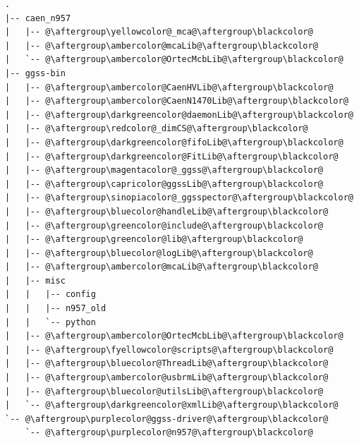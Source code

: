 \newpage

\begin{lstlisting}[language=Cmd, caption={Pierwotna struktura katalogów}, label={lst:oldStructure},escapechar=@]
.
|-- caen_n957
|   |-- @\aftergroup\yellowcolor@_mca@\aftergroup\blackcolor@
|   |-- @\aftergroup\ambercolor@mcaLib@\aftergroup\blackcolor@
|   `-- @\aftergroup\ambercolor@OrtecMcbLib@\aftergroup\blackcolor@
|-- ggss-bin
|   |-- @\aftergroup\ambercolor@CaenHVLib@\aftergroup\blackcolor@
|   |-- @\aftergroup\ambercolor@CaenN1470Lib@\aftergroup\blackcolor@
|   |-- @\aftergroup\darkgreencolor@daemonLib@\aftergroup\blackcolor@
|   |-- @\aftergroup\redcolor@_dimCS@\aftergroup\blackcolor@
|   |-- @\aftergroup\darkgreencolor@fifoLib@\aftergroup\blackcolor@
|   |-- @\aftergroup\darkgreencolor@FitLib@\aftergroup\blackcolor@
|   |-- @\aftergroup\magentacolor@_ggss@\aftergroup\blackcolor@
|   |-- @\aftergroup\capricolor@ggssLib@\aftergroup\blackcolor@
|   |-- @\aftergroup\sinopiacolor@_ggsspector@\aftergroup\blackcolor@
|   |-- @\aftergroup\bluecolor@handleLib@\aftergroup\blackcolor@
|   |-- @\aftergroup\greencolor@include@\aftergroup\blackcolor@
|   |-- @\aftergroup\greencolor@lib@\aftergroup\blackcolor@
|   |-- @\aftergroup\bluecolor@logLib@\aftergroup\blackcolor@
|   |-- @\aftergroup\ambercolor@mcaLib@\aftergroup\blackcolor@
|   |-- misc
|   |   |-- config
|   |   |-- n957_old
|   |   `-- python
|   |-- @\aftergroup\ambercolor@OrtecMcbLib@\aftergroup\blackcolor@
|   |-- @\aftergroup\fyellowcolor@scripts@\aftergroup\blackcolor@
|   |-- @\aftergroup\bluecolor@ThreadLib@\aftergroup\blackcolor@
|   |-- @\aftergroup\ambercolor@usbrmLib@\aftergroup\blackcolor@
|   |-- @\aftergroup\bluecolor@utilsLib@\aftergroup\blackcolor@
|   `-- @\aftergroup\darkgreencolor@xmlLib@\aftergroup\blackcolor@
`-- @\aftergroup\purplecolor@ggss-driver@\aftergroup\blackcolor@
    `-- @\aftergroup\purplecolor@n957@\aftergroup\blackcolor@
\end{lstlisting}


\onecolumn

\newpage

\twocolumn

